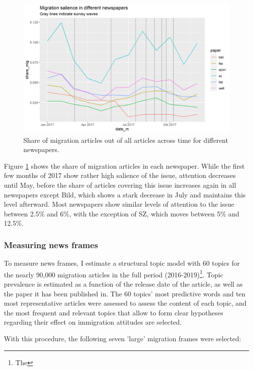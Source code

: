 \documentclass{article}
\begin{document}
\begin{figure}[!ht]
    \centering
    \includegraphics[width=\textwidth]{paper/vis/salience_papers_focus.png}
    \caption{Share of migration articles out of all articles across time for different newspapers.}
    \label{fig:salience}
\end{figure}

Figure \ref{fig:salience} shows the share of migration articles in each newspaper. While the first few months of 2017 show rather high salience of the issue, attention decreases until May, before the share of articles covering this issue increases again in all newspapers except Bild, which shows a stark decrease in July and maintains this level afterward. Most newspapers show similar levels of attention to the issue between 2.5\% and 6\%, with the exception of SZ, which moves between 5\% and 12.5\%.

\subsubsection{Measuring news frames}

To measure news frames, I estimate a structural topic model with 60 topics for the nearly 90,000 migration articles in the full period (2016-2019)\footnote{The }. Topic prevalence is estimated as a function of the release date of the article, as well as the paper it has been published in. The 60 topics' most predictive words and ten most representative articles were assessed to assess the content of each topic, and the most frequent and relevant topics that allow to form clear hypotheses regarding their effect on immigration attitudes are selected. 

With this procedure, the following seven 'large' migration frames were selected:
\end{document}
